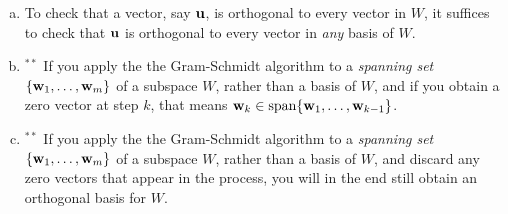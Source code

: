 \begin{prob}
\begin{enumerate}[a)]
\medskip
%
\item\sov To check that a vector, say $\mathbf{u}$, is orthogonal to every vector in $W$, it suffices to check that $\mathbf{u}$ is orthogonal to every vector in {\it any} basis of $W$.
\medskip
%
\item$^{\ast\ast}$ If you apply the the Gram-Schmidt algorithm to a {\it spanning set} $\{\mathbf{w}_1, \dots , \mathbf{w}_m \}$ of a subspace $W$, rather than a basis of $W$, and if you obtain a zero vector at step $k$, that means $\mathbf{w}_k \in \textrm{span}\{\mathbf{w}_1, \dots , \mathbf{w}_{k-1}\}$.
\medskip
%
\item $^{\ast\ast}$ If you apply the the Gram-Schmidt algorithm to a {\it spanning set} $\{\mathbf{w}_1, \dots , \mathbf{w}_m \}$ of a subspace $W$, rather than a basis of $W$, and discard any zero vectors that appear in the process, you will in the end still obtain an orthogonal basis for $W$.
\medskip
%
\end{enumerate}
\end{prob}
  
